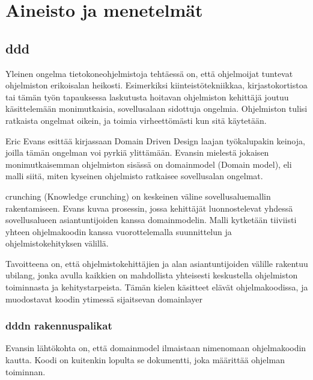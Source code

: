 \hypertarget{aineisto-ja-menetelmuxe4t}{%
\chapter{Aineisto ja menetelmät}\label{aineisto-ja-menetelmuxe4t}}

\hypertarget{section}{%
\section{\texorpdfstring{\gls{ddd}}{}}\label{section}}

Yleinen ongelma tietokoneohjelmistoja tehtäessä on, että ohjelmoijat
tuntevat ohjelmiston erikoisalan heikosti. Esimerkiksi
kiinteistötekniikkaa, kirjastokortistoa tai tämän työn tapauksessa
laskutusta hoitavan ohjelmiston kehittäjä joutuu käsittelemään
monimutkaisia, sovellusalaan sidottuja ongelmia. Ohjelmiston tulisi
ratkaista ongelmat oikein, ja toimia virheettömästi kun sitä käytetään.

Eric Evans esittää kirjassaan Domain Driven Design laajan työkalupakin
keinoja, joilla tämän ongelman voi pyrkiä ylittämään. Evansin mielestä
jokaisen monimutkaisemman ohjelmiston sisässä on \gls{domainmodel}
(Domain model), eli malli siitä, miten kyseinen ohjelmisto ratkaisee
sovellusalan ongelmat.

\Gls{crunching} (Knowledge crunching) on keskeinen väline
sovellusaluemallin rakentamiseen. Evans kuvaa prosessin, jossa
kehittäjät luonnostelevat yhdessä sovellusalueen asiantuntijoiden kanssa
\gls{domainmodel}in. Malli kytketään tiiviisti yhteen ohjelmakoodin
kanssa vuorottelemalla suunnittelun ja ohjelmistokehityksen välillä.
\cite[s. 13]{evans:ddd}

Tavoitteena on, että ohjelmistokehittäjien ja alan asiantuntijoiden
välille rakentuu \gls{ubilang}, jonka avulla kaikkien on mahdollista
yhteisesti keskustella ohjelmiston toiminnasta ja kehitystarpeista.
Tämän kielen käsitteet elävät ohjelmakoodissa, ja muodostavat koodin
ytimessä sijaitsevan \gls{domainlayer}

\hypertarget{n-rakennuspalikat}{%
\subsection{\texorpdfstring{\gls{ddd}n
rakennuspalikat}{n rakennuspalikat}}\label{n-rakennuspalikat}}

Evansin lähtökohta on, että \gls{domainmodel} ilmaistaan nimenomaan
ohjelmakoodin kautta. Koodi on kuitenkin lopulta se dokumentti, joka
määrittää ohjelman toiminnan.

